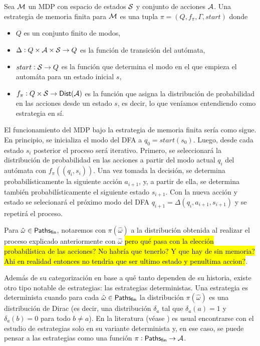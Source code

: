 \begin{definition}
	Sea $\mathcal{M}$ un MDP con espacio de estados $\mathcal{S}$ y conjunto de acciones $\mathcal{A}$. Una estrategia de memoria finita para $\mathcal{M}$ es una tupla $\pi = (Q, f_\pi, \Gamma, start)$ donde
	\begin{itemize}
		\item $Q$ es un conjunto finito de modos,
		\item $\Delta : Q \times \mathcal{A} \times \mathcal{S} \rightarrow Q$ es la función de transición del autómata,
		\item $start: \mathcal{S} \rightarrow Q$ es la función que determina el modo en el que empieza el automáta para un estado inicial $s$,
		\item $f_\pi : Q \times \mathcal{S} \rightarrow \mathsf{Dist}(\mathcal{A})$ es la función que asigna la distribución de probabilidad en las acciones desde un estado $s$, es decir, lo que veníamos entendiendo como estrategia en sí.
	\end{itemize}
	El funcionamiento del MDP bajo la estrategia de memoria finita sería como sigue. En principio, se inicializa el modo del DFA a $q_0 = start(s_0)$. Luego, desde cada estado $s_i$ posterior el proceso será iterativo. Primero, se seleccionará la distribución de probabilidad en las acciones a partir del modo actual $q_i$ del autómata con $f_\pi((q_i,s_i))$. Una vez tomada la decisión, se determina probabilísticamente la siguiente acción $a_{i+1}$, y, a partir de ella, se determina también probabilísticamente el siguiente estado $s_{i+1}$. Con la nueva acción y estado se selecionará el próximo modo del DFA $q_{i+1} = \Delta(q_i, a_{i+1}, s_{i+1})$ y se repetirá el proceso.

	Para $\hat \omega \in \textsf{Paths}_\textsf{fin}$, notaremos con $\pi(\hat \omega)$ a la
	distribución obtenida al realizar el proceso explicado anteriormente con $\hat
		\omega$ \hl{pero qué pasa con la elección probabilística de las acciones? No
		habría que tenerlo? Y que hay de sin memoria? Ahi en realidad entonces no
		tendria que ser ultimo estado y penultima accion?}.
\end{definition}

Además de su categorización en base a qué tanto dependen de su historia, existe
otro tipo notable de estrategias: las estrategias deterministas. Una estrategia
es determinista cuando para cada $\hat \omega \in \textsf{Paths}_\textsf{fin}$ la distribución
$\pi(\hat \omega)$ es una distribución de Dirac (es decir, una distribución
$\delta_a$ tal que $\delta_a(a) = 1$ y $\delta_a(b) = 0$ para todo $b \neq a$).
En la literatura (véase \cite{BaierKatoen, AlfaroThesis}) es usual encontrarse
con el estudio de estrategias solo en su variante determinista y, en ese caso,
se puede pensar a las estrategias como una función $\pi: \textsf{Paths}_\textsf{fin} \rightarrow
	\mathcal{A}$.

